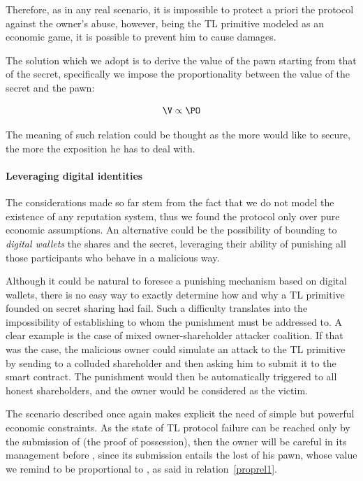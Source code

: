 Therefore, as in any real scenario, it is impossible to protect a priori the protocol against the owner's abuse, however, being the TL primitive modeled as an economic game, it is possible to prevent him to cause damages. 

The solution which we adopt is to derive the value of the pawn starting from that of the secret, specifically we impose the proportionality between the value of the secret and the pawn:

\begin{equation}\label{proprel1}
\V \propto \PO
\end{equation}

The meaning of such relation could be thought as the more \owner would like to secure, the more the exposition he has to deal with.

\paragraph{Leveraging digital identities}
The considerations made so far stem from the fact that we do not model the existence of any reputation system, thus we found the protocol only over pure economic assumptions. An alternative could be the possibility of bounding to {\em digital wallets} the shares and the secret, leveraging their ability of punishing all those participants who behave in a malicious way.

Although it could be natural to foresee a punishing mechanism based on digital wallets, there is no easy way to exactly determine how and why a TL primitive founded on secret sharing had fail. Such a difficulty translates into the impossibility of establishing to whom the punishment must be addressed to. A clear example is the case of mixed owner-shareholder attacker coalition. If that was the case, the malicious owner could simulate an attack to the TL primitive by sending \secret to a colluded shareholder and then asking him to submit it to the smart contract. The punishment would then be automatically triggered to all honest shareholders, and the owner would be considered as the victim.

The scenario described once again makes explicit the need of simple but powerful economic constraints. As the state of TL protocol failure can be reached only by the submission of \secret (the proof of possession), then the owner will be careful in its management before \td, since its submission entails the lost of his pawn, whose value we remind to be proportional to \secret, as said in relation~\ref{proprel1}.

